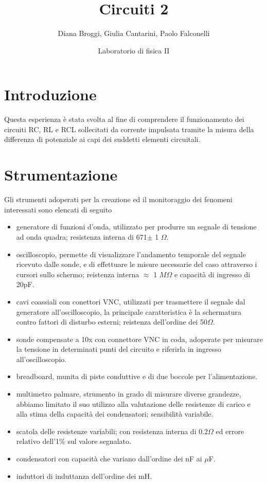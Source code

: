 \documentclass[a4paper]{article}
\title{Circuiti 2}
\date{Laboratorio di fisica II}
\author{Diana Broggi, Giulia Cantarini, Paolo Falconelli}
\theoremstyle{definition}
\begin{document}
\maketitle
\tableofcontents

\section{Introduzione}
Questa esperienza è stata svolta al fine di comprendere il funzionamento dei circuiti RC, RL e RCL sollecitati da corrente impulsata tramite la misura della differenza di potenziale ai capi dei suddetti elementi circuitali. \\

\section{Strumentazione}
Gli strumenti adoperati per la creazione ed il monitoraggio dei fenomeni interessati sono elencati di seguito \\

\begin{itemize}
    \item generatore di funzioni d'onda, utilizzato per produrre un segnale di tensione ad onda quadra; resistenza interna di 671\(\pm\) 1 \(\Omega\).
    \item oscilloscopio, permette di visualizzare l'andamento temporale del segnale ricevuto dalle sonde, e di effettuare le  misure necessarie del caso attraverso i cursori sullo schermo; reistenza interna \(\approx\) 1 \(M\Omega\) e capacità di ingresso di 20pF.
    \item cavi coassiali con conettori VNC, utilizzati per trasmettere il segnale dal generatore all'oscilloscopio, la principale caratteristica è la schermatura contro fattori di disturbo esterni; reistenza dell'ordine dei 50\(\Omega\).
    \item sonde compensate a 10x con connettore VNC in coda, adoperate per misurare la tensione in determinati punti del circuito e riferirla in ingresso all'oscilloscopio.
    \item breadboard, munita di piste conduttive e di due boccole per l'alimentazione.
     \item multimetro palmare, strumento in grado di misurare diverse grandezze, abbiamo limitato il suo utilizzo alla valutazione delle resistenze di carico e alla stima della capacità dei condensatori; sensibilità variabile. 
    \item scatola delle resistenze variabili; con resistenza interna di 0.2\(\Omega\) ed errore relativo dell'1\% sul valore segnalato.
    \item condensatori con capacità che variano dall'ordine dei nF ai \(\mu\)F.
    \item induttori di induttanza dell'ordine dei mH.
  
\end{itemize}
\end{document}
